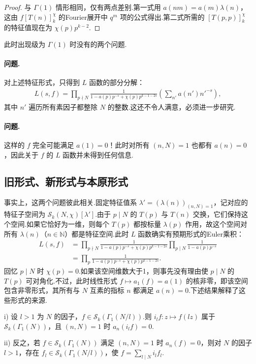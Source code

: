 \begin{proof}

与 $\Gamma(1)$ 情形相同，仅有两点差别.第一式用 $a(nm)=a(m)\lambda(n)$，这由 $f[T(n)]_k^\chi$ 的Fourier展开中 $q^m$ 项的公式得出.第二式所需的 $[T(p,p)]_k^\chi$ 的特征值现在为 $\chi(p)p^{k-2}$.

\end{proof}

此时出现级为 $\Gamma(1)$ 时没有的两个问题.

\paragraph{问题.}对上述特征形式，只得到 $L$ 函数的部分分解：
\begin{align*}
L(s,f)=\prod_{p\nmid N}\frac1{1-a(p)p^{-s}+\chi(p)p^{k-1-2s}}\left(\sum_{n'}a(n')n'^{-s}\right),
\end{align*}
其中 $n'$ 遍历所有素因子都整除 $N$ 的整数.这还不令人满意，必须进一步研究.

\paragraph{问题.}这样的 $f$ 完全可能满足 $a(1)=0$！此时对所有 $(n,N)=1$ 也都有 $a(n)=0$，因此关于 $f$ 的 $L$ 函数并未得到任何信息.

\subsection{旧形式、新形式与本原形式}\label{sec:modular-1-3-6}

事实上，这两个问题彼此相关.固定特征值系 $\lambda'=(\lambda(n))_{(n,N)=1}$，记对应的特征子空间为 $\mathcal S_k(N,\chi)[\lambda']$.由于 $p\mid N$ 的 $T(p)$ 与 $T(n)$ 交换，它们保持这个空间.如果它恰好为一维，则每个 $T(p)$ 都按标量 $\lambda(p)$ 作用，故这个空间对所有 $\lambda(n)$（$n\in\mathbb N$）都是特征空间.此时 $L$ 函数确实有预期形式的Euler乘积：
\begin{align*}
L(s,f)&=\prod_{p\nmid N}\frac1{1-a(p)p^{-s}+\chi(p)p^{k-1-2s}}\prod_{p\mid N}\frac1{1-a(p)p^{-s}}\\
&=\prod_p\frac1{1-a(p)p^{-s}+\chi(p)p^{k-1-2s}}.
\end{align*}
回忆 $p\mid N$ 时 $\chi(p)=0$.如果该空间维数大于1，则事先没有理由使 $p\mid N$ 的 $T(p)$ 可对角化.不过，此时线性形式 $f\mapsto a_1(f)=a(1)$ 的核非零，即该空间包含非零形式，其所有与 $N$ 互素的指标 $n$ 都满足 $a(n)=0$.下述结果解释了这些形式的来源.

\begin{theorem*}

i) 设 $l>1$ 为 $N$ 的因子，$f\in\mathcal S_k(\Gamma_1(N/l))$.则 $i_lf:z\mapsto f(lz)$ 属于 $\mathcal S_k(\Gamma_1(N))$，且 $(n,N)=1$ 时 $a_n(i_lf)=0$.

ii) 反之，若 $f\in\mathcal S_k(\Gamma_1(N))$ 满足 $(n,N)=1$ 时 $a_n(f)=0$，则对 $N$ 的因子 $l>1$，存在 $f_l\in\mathcal S_k(\Gamma_1(N/l))$，使 $f=\sum_{l\mid N}i_lf_l$.

\end{theorem*}

